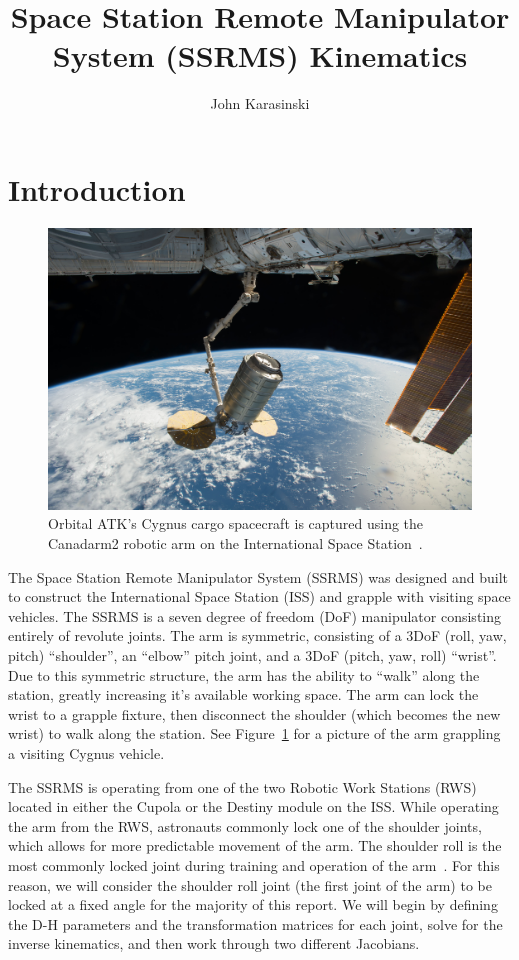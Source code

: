 \documentclass{article}
\author{John Karasinski}
\title{Space Station Remote Manipulator System (SSRMS) Kinematics}
\begin{document}
\maketitle
\tableofcontents
\clearpage

\section{Introduction}

\begin{figure}[b!]
\includegraphics[width=\textwidth]{ssrms.jpg}
\caption{Orbital ATK's Cygnus cargo spacecraft is captured using the Canadarm2 robotic arm on the International Space Station~\cite{ssrms_cc}.}
\label{ssrms_image}
\end{figure}

The Space Station Remote Manipulator System (SSRMS) was designed and built to construct the International Space Station (ISS) and grapple with visiting space vehicles.
The SSRMS is a seven degree of freedom (DoF) manipulator consisting entirely of revolute joints.
The arm is symmetric, consisting of a 3DoF (roll, yaw, pitch) ``shoulder'', an ``elbow'' pitch joint, and a 3DoF (pitch, yaw, roll) ``wrist''.
Due to this symmetric structure, the arm has the ability to ``walk'' along the station, greatly increasing it's available working space.
The arm can lock the wrist to a grapple fixture, then disconnect the shoulder (which becomes the new wrist) to walk along the station.
See Figure~\ref{ssrms_image} for a picture of the arm grappling a visiting Cygnus vehicle.

The SSRMS is operating from one of the two Robotic Work Stations (RWS) located in either the Cupola or the Destiny module on the ISS.
While operating the arm from the RWS, astronauts commonly lock one of the shoulder joints, which allows for more predictable movement of the arm.
The shoulder roll is the most commonly locked joint during training and operation of the arm~\cite{astro_emails}.
For this reason, we will consider the shoulder roll joint (the first joint of the arm) to be locked at a fixed angle for the majority of this report.
We will begin by defining the D-H parameters and the transformation matrices for each joint, solve for the inverse kinematics, and then work through two different Jacobians.
\end{document}
